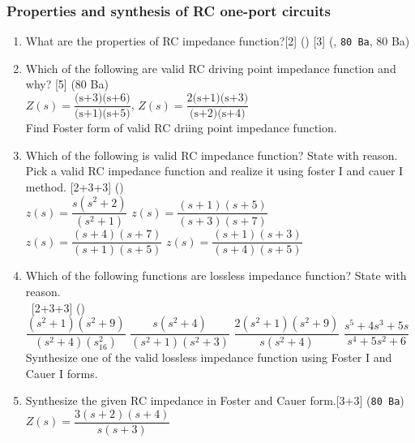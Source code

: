 \documentclass[12pt]{article}
\newcommand{\enter}{\\\textcolor{white}{1}}
\begin{document}
\subsubsection{Properties and synthesis of RC one-port circuits}
\begin{enumerate}
	\item What are the properties of RC impedance function?\hfill [2] () [3] (, \texttt{80 Ba}, 80 Ba)
	
	\item Which of the following are valid RC driving point impedance function and why? \hfill [5] (80 Ba)\\
	$Z(s) = \dfrac{\text{(s+3)(s+6)}}{\text{(s+1)(s+5)}}$, \hspace{1cm} $Z(s) = \dfrac{\text{2(s+1)(s+3)}}{\text{(s+2)(s+4)}}$\\
	Find Foster form of valid RC driing point impedance function.
	
	\item Which of the following is valid RC impedance function? State with reason. Pick a valid RC impedance function and realize it using foster I and cauer I method. \hfill [2+3+3] ()\\
	$z(s) = \dfrac{s(s^2+2)}{(s^2+1)}$ \hspace{2.8cm}
	$z(s) = \dfrac{(s+1)(s+5)}{(s+3)(s+7)}$ \\
	$z(s) = \dfrac{(s+4)(s+7)}{(s+1)(s+5)}$ \hspace{2cm}
	$z(s) = \dfrac{(s+1)(s+3)}{(s+4)(s+5)}$ 
	
	\item Which of the following functions are lossless impedance function? State with reason. 
	\enter\hfill [2+3+3] ()\\
	$\dfrac{(s^2+1)(s^2+9)}{(s^2+4)(s^2_16)}$ \hspace{1cm}
	$\dfrac{s(s^2+4)}{(s^2+1)(s^2+3)}$ \hspace{1cm}
	$\dfrac{2(s^2+1)(s^2+9)}{s(s^2+4)}$ \hspace{1cm}
	$\dfrac{s^5+4s^3+5s}{s^4+5s^2+6}$\\
	Synthesize one of the valid lossless impedance function using Foster I and Cauer I forms.	
	
	\item Synthesize the given RC impedance in Foster and Cauer form.\hfill[3+3] (\texttt{80 Ba})\\
$Z(s) = \dfrac{3(s+2)(s+4)}{s(s+3)}$
\end{enumerate}
\end{document}
